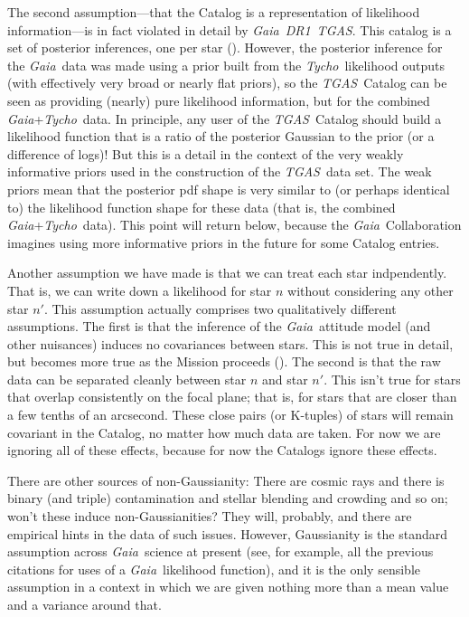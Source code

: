 \documentclass[12pt, modern]{aastex62h}
\newcommand{\acronym}[1]{{\small{#1}}}
\newcommand{\Gaia}{\textsl{Gaia}}
\newcommand{\Tycho}{\textsl{Tycho}}
\newcommand{\DRone}{\textsl{\acronym{DR1}}}
\newcommand{\TGAS}{\textsl{\acronym{TGAS}}}
\begin{document}
The second assumption---that the Catalog is a representation of likelihood
information---is in fact violated in detail by \Gaia\ \DRone\ \TGAS.
This catalog is a set of posterior inferences, one per star (\citealt{michalik, dr1}).
However, the posterior inference for the \Gaia\ data was made using a prior
built from the \Tycho\ likelihood outputs (with effectively very broad
or nearly flat priors),
so the \TGAS\ Catalog can be seen as providing (nearly) pure likelihood information,
but for the combined \Gaia +\Tycho\ data.
In principle, any user of the \TGAS\ Catalog should build a likelihood function
that is a ratio of the posterior Gaussian to the prior (or a difference
of logs)!
But this is a detail in the context of the very weakly informative priors
used in the construction of the \TGAS\ data set.
The weak priors mean that the posterior pdf shape is very similar to
(or perhaps identical to) the likelihood
function shape for these data (that is, the combined \Gaia +\Tycho\ data).
This point will return below, because the \Gaia\ Collaboration imagines using
more informative priors in the future for some Catalog entries.

Another assumption we have made is that we can treat each star indpendently.
That is, we can write down a likelihood for star $n$ without considering any
other star $n'$.
This assumption actually comprises two qualitatively different assumptions.
The first is that the inference of the \Gaia\ attitude model (and other nuisances)
induces no covariances between stars.
This is not true in detail, but becomes more true as the Mission proceeds
(\citealt{holl}).
The second is that the raw data can be separated cleanly between star $n$ and
star $n'$.
This isn't true for stars that overlap consistently on the focal plane; that is,
for stars that are closer than a few tenths of an arcsecond.
These close pairs (or K-tuples) of stars will remain covariant in the
Catalog, no matter how much data are taken.
For now we are ignoring all of these effects, because for now the Catalogs ignore
these effects.

There are other sources of non-Gaussianity:
There are cosmic rays and there is binary (and triple)
contamination and stellar blending and crowding and so on; won't these
induce non-Gaussianities?
They will, probably, and there are empirical hints in the data
of such issues.
However, Gaussianity is the standard assumption across \Gaia\ science at
present (see, for example, all the previous citations for uses of a
\Gaia\ likelihood function), and it is the only sensible assumption in a
context in which we are given nothing more than a mean value and a variance
around that.
\end{document}
